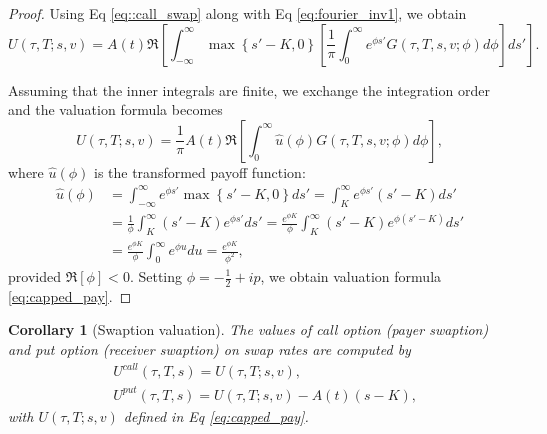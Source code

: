\documentclass[pdftex,11pt,a4paper] {article}
\newtheorem{corollary}{Corollary}[section]
\begin{document}
\begin{proof}
Using Eq \eqref{eq::call_swap} along with Eq \eqref{eq:fourier_inv1}, we obtain
\begin{equation} \label{eq:fourier_inv2}
U(\tau, T; s, v) = A(t)\Re\left[ \int^{\infty}_{-\infty}\max\left\{s'-K,0\right\} \left[\frac{1}{\pi} \int^{\infty}_{0}e^{\phi s'} G(\tau,T, s, v;\phi)d\phi\right]ds'\right].
\end{equation}

Assuming that the inner integrals are finite, we exchange the integration order and the valuation formula becomes
\begin{equation} \label{eq:fourier_inv3}
U(\tau, T; s, v) = \frac{1}{\pi} A(t)\Re\left[\int^{\infty}_{0}\widehat{u}(\phi)G(\tau,T,s,v;\phi)d\phi\right],
\end{equation}
where $\widehat{u}(\phi)$ is the transformed payoff function:
\begin{equation} \label{eq:fourier_inv4}
\begin{split}
\widehat{u}(\phi) & =  \int^{\infty}_{-\infty}e^{\phi s'} \max\left\{s'-K,0\right\}  ds' = \int_{K}^{\infty}e^{\phi s'} (s'-K) ds'\\
& = \frac{1}{\phi}\int_{K}^{\infty} (s'-K) e^{\phi s'}ds'=\frac{e^{\phi K}}{\phi}\int_{K}^{\infty} (s'-K) e^{\phi (s'-K)}ds'\\
	&=\frac{e^{\phi K}}{\phi}\int_{0}^{\infty} e^{\phi u}du=
		\frac{e^{\phi K}}{\phi^2},
\end{split} 
\end{equation}
provided $\Re[\phi]<0$. Setting $\phi=-\frac{1}{2}+ip$, we obtain valuation formula \eqref{eq:capped_pay}.

\end{proof}

\begin{corollary}[Swaption valuation]\label{cl:swaptions}
The values of call option (payer swaption) and put option (receiver swaption) on swap rates are computed by
\begin{equation}\label{eq:swaptions}
\begin{split}
&U^{call}(\tau, T, s)=U(\tau, T; s, v),\\
&U^{put}(\tau, T, s)=U(\tau, T; s, v)-A(t)(s-K),
\end{split}
\end{equation}
with $U(\tau, T; s, v)$ defined in Eq \eqref{eq:capped_pay}.

\end{corollary}

 
\end{document}

